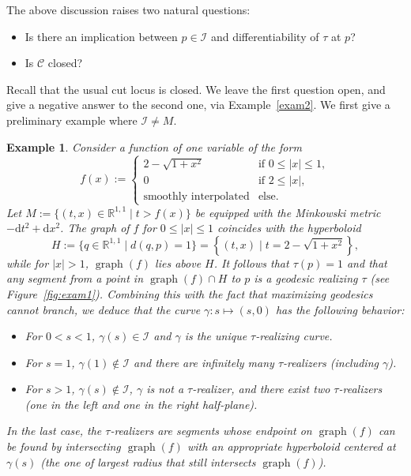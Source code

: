 \documentclass[a4paper,11pt]{amsart}
\newtheorem{example}[theorem]{{Example}}%
\newcommand{\I}{\mathcal{I}}
\newcommand{\R}{\mathbb{R}}
\newcommand{\df}{\mathrm{d}}
\begin{document}
The above discussion raises two natural questions:
\begin{itemize}
    \item Is there an implication between $p \in \I$ and differentiability of $\tau$ at $p$?
    \item Is $\mathcal{C}$ closed?
\end{itemize}
Recall that the usual cut locus is closed. We leave the first question open, and give a negative answer to the second one, via Example~\ref{exam2}. We first give a preliminary example where $\I \neq M$.

\begin{example} \label{exam1}
 Consider a function of one variable of the form
 \begin{equation*}
  f(x) := \begin{cases}
             2-\sqrt{1+x^2} &\text{if } 0 \leq \vert x \vert \leq 1, \\
             0 &\text{if } 2 \leq \vert x \vert, \\
             \text{smoothly interpolated} &\text{else.}
            \end{cases}
 \end{equation*}
 Let $M := \{ (t,x) \in \R^{1,1} \mid t > f(x) \}$ be equipped with the Minkowski metric $-\df t^2 + \df x^2$. The graph of $f$ for $0 \leq \vert x \vert \leq 1$ coincides with the hyperboloid 
 \begin{equation*}
     H := \{q \in \R^{1,1} \mid d(q,p) = 1\} = \left\{ (t,x) \mid t = 2-\sqrt{1+x^2} \right\},
 \end{equation*}
 while for $\vert x \vert > 1$, $\operatorname{graph} (f)$ lies above $H$. It follows that $\tau(p) = 1$ and that any segment from a point in $\operatorname{graph} (f) \cap H$ to $p$ is a geodesic realizing $\tau$ (see Figure~\ref{fig:exam1}). Combining this with the fact that maximizing geodesics cannot branch, we deduce that the curve $\gamma \colon s \mapsto (s,0)$ has the following behavior:
 \begin{itemize}
  \item For $0 < s < 1$, $\gamma(s) \in \I$ and $\gamma$ is the unique $\tau$-realizing curve.
  \item For $s = 1$, $\gamma(1) \not\in \I$ and there are infinitely many $\tau$-realizers (including $\gamma$).
  \item For $s > 1$, $\gamma(s) \not\in \I$, $\gamma$ is not a $\tau$-realizer, and there exist two $\tau$-realizers (one in the left and one in the right half-plane).
 \end{itemize}
 In the last case, the $\tau$-realizers are segments whose endpoint on $\operatorname{graph} (f)$ can be found by intersecting $\operatorname{graph} (f)$ with an appropriate hyperboloid centered at $\gamma(s)$ (the one of largest radius that still intersects $\operatorname{graph} (f)$).
\end{example}
\end{document}
